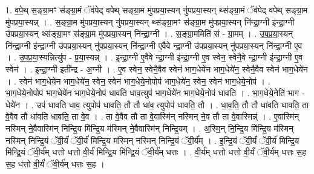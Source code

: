 \documentclass[17pt]{extarticle}
\begin{document}
1. व॒पे॒थ् स॒ङ्ग्रा॒मꣳ स॑ङ्ग्रा॒मं ॅव॑पेद् वपेथ् सङ्ग्रा॒म 
मु॑पप्रया॒स्यन् नु॑पप्रया॒स्यन् थ्स॑ङ्ग्रा॒मं ॅव॑पेद् वपेथ् सङ्ग्रा॒म मु॑पप्रया॒स्यन्न् । . स॒ङ्ग्रा॒म मु॑पप्रया॒स्यन् नु॑पप्रया॒स्यन् थ्स॑ङ्ग्रा॒मꣳ स॑ङ्ग्रा॒म मु॑पप्रया॒स्यन् नि॑न्द्रा॒ग्नी इ॑न्द्रा॒ग्नी उ॑पप्रया॒स्यन् थ्स॑ङ्ग्रा॒मꣳ स॑ङ्ग्रा॒म मु॑पप्रया॒स्यन् नि॑न्द्रा॒ग्नी । . स॒ङ्ग्रा॒ममिति॑ सं - ग्रा॒मम् । . उ॒प॒प्र॒या॒स्यन् नि॑न्द्रा॒ग्नी इ॑न्द्रा॒ग्नी उ॑पप्रया॒स्यन् नु॑पप्रया॒स्यन् नि॑न्द्रा॒ग्नी ए॒वैवे न्द्रा॒ग्नी उ॑पप्रया॒स्यन् नु॑पप्रया॒स्यन् नि॑न्द्रा॒ग्नी ए॒व । . उ॒प॒प्र॒या॒स्यन्नित्यु॑प - प्र॒या॒स्यन्न् । . इ॒न्द्रा॒ग्नी ए॒वैवे न्द्रा॒ग्नी इ॑न्द्रा॒ग्नी ए॒व स्वेन॒ स्वेनै॒वे न्द्रा॒ग्नी इ॑न्द्रा॒ग्नी ए॒व स्वेन॑ । . इ॒न्द्रा॒ग्नी इती᳚न्द्र - अ॒ग्नी । . ए॒व स्वेन॒ स्वेनै॒वैव स्वेन॑ भाग॒धेये॑न भाग॒धेये॑न॒ स्वेनै॒वैव स्वेन॑ भाग॒धेये॑न । . स्वेन॑ भाग॒धेये॑न भाग॒धेये॑न॒ स्वेन॒ स्वेन॑ भाग॒धेये॒नोपोप॑ भाग॒धेये॑न॒ स्वेन॒ स्वेन॑ भाग॒धेये॒नोप॑ । . भा॒ग॒धेये॒नोपोप॑ भाग॒धेये॑न भाग॒धेये॒नोप॑ धावति धाव॒त्युप॑ भाग॒धेये॑न भाग॒धेये॒नोप॑ धावति । . भा॒ग॒धेये॒नेति॑ भाग - धेये॑न । . उप॑ धावति धाव॒ त्युपोप॑ धावति॒ तौ तौ धा॑व॒ त्युपोप॑ धावति॒ तौ । . धा॒व॒ति॒ तौ तौ धा॑वति धावति॒ ता वे॒वैव तौ धा॑वति धावति॒ ता वे॒व । . ता वे॒वैव तौ ता वे॒वास्मि॑न् नस्मिन् ने॒व तौ ता वे॒वास्मिन्न्॑ । . ए॒वास्मि॑न् नस्मिन् ने॒वैवास्मि॑न् निन्द्रि॒य मि॑न्द्रि॒य म॑स्मिन् ने॒वैवास्मि॑न् निन्द्रि॒यम् । . अ॒स्मि॒न् नि॒न्द्रि॒य मि॑न्द्रि॒य म॑स्मिन् नस्मिन् निन्द्रि॒यं ॅवी॒र्यं॑ ॅवी॒र्य॑ मिन्द्रि॒य म॑स्मिन् नस्मिन् निन्द्रि॒यं ॅवी॒र्य᳚म् । . इ॒न्द्रि॒यं ॅवी॒र्यं॑ ॅवी॒र्य॑ मिन्द्रि॒य मि॑न्द्रि॒यं ॅवी॒र्य॑म् धत्तो धत्तो वी॒र्य॑ मिन्द्रि॒य मि॑न्द्रि॒यं ॅवी॒र्य॑म् धत्तः । . वी॒र्य॑म् धत्तो धत्तो वी॒र्यं॑ ॅवी॒र्य॑म् धत्तः स॒ह स॒ह ध॑त्तो वी॒र्यं॑ ॅवी॒र्य॑म् धत्तः स॒ह । \newline
\end{document}
